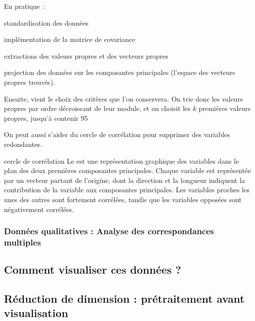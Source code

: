 En pratique~:
\begin{enumeratebf}
    \item standardisation des données
    \item implémentation de la matrice de covariance
    \item extractions des valeurs propres et des vecteurs propres
    \item projection des données sur les composantes principales (l'espace des vecteurs propres trouvés).
\end{enumeratebf}

Ensuite, vient le choix des critères que l'on conservera. On trie donc les valeurs propres par ordre décroissant de leur module, et on choisit les $k$ premières valeurs propres, jusqu'à contenir 95%

On peut aussi s'aider du cercle de corrélation pour supprimer des variables redondantes.

\begin{definition}{}{cercle de corrélation}
    Le  est une représentation graphique des variables dans le plan des deux premières composantes principales. Chaque variable est représentée par un vecteur partant de l'origine, dont la direction et la longueur indiquent la contribution de la variable aux composantes principales. Les variables proches les unes des autres sont fortement corrélées, tandis que les variables opposées sont négativement corrélées.
\end{definition}





\subsubsection{Données qualitatives : Analyse des correspondances multiples}




\subsection{Comment visualiser ces données ?}
\subsection{Réduction de dimension : prétraitement avant visualisation}


